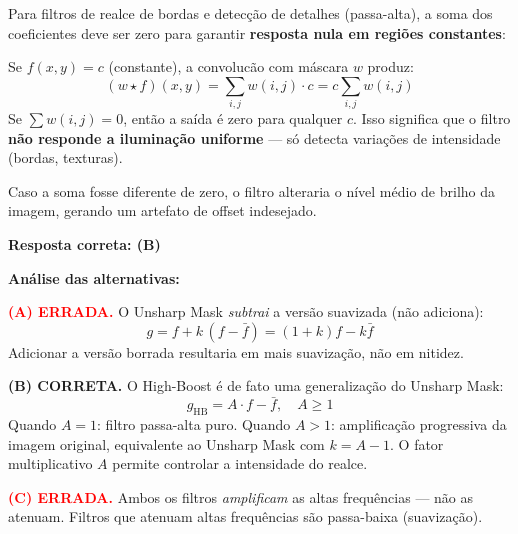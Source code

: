 \documentclass[12pt,a4paper,oneside,brazil]{abntex2}
\begin{document}
\begin{questao}[title=Quest\~ao 4 -- Soma dos coeficientes da m\'ascara = 0]
\end{questao}

\begin{resposta}
Para filtros de realce de bordas e detec\c{c}\~ao de detalhes
(passa-alta), a soma dos coeficientes deve ser zero para garantir
\textbf{resposta nula em regi\~oes constantes}:

Se $f(x,y) = c$ (constante), a convoluc\~ao com m\'ascara $w$ produz:
\[
  (w \star f)(x,y) = \sum_{i,j} w(i,j)\cdot c = c\sum_{i,j}w(i,j)
\]
Se $\sum w(i,j) = 0$, ent\~ao a sa\'ida \'e zero para qualquer $c$.
Isso significa que o filtro \textbf{n\~ao responde a ilumina\c{c}\~ao
uniforme} --- s\'o detecta varia\c{c}\~oes de intensidade (bordas,
texturas).

Caso a soma fosse diferente de zero, o filtro alteraria o n\'ivel
m\'edio de brilho da imagem, gerando um artefato de offset indesejado.
\end{resposta}

\begin{questao}[title=Quest\~ao 5 -- Unsharp Mask e High-Boost (m\'ultipla escolha)]
\end{questao}

\begin{resposta}
\textbf{Resposta correta: (B)}

\medskip
\noindent\textbf{Análise das alternativas:}

\medskip
\noindent\textcolor{red}{\textbf{(A) ERRADA.}} O Unsharp Mask
\emph{subtrai} a vers\~ao suavizada (n\~ao adiciona):
\[
  g = f + k\,(f - \bar{f}) = (1+k)f - k\bar{f}
\]
Adicionar a vers\~ao borrada resultaria em mais suaviza\c{c}\~ao,
n\~ao em nitidez.

\medskip
\noindent\textcolor{green!60!black}{\textbf{(B) CORRETA.}} O High-Boost
\'e de fato uma generaliza\c{c}\~ao do Unsharp Mask:
\[
  g_{\text{HB}} = A \cdot f - \bar{f}, \quad A \geq 1
\]
Quando $A = 1$: filtro passa-alta puro.
Quando $A > 1$: amplifica\c{c}\~ao progressiva da imagem original,
equivalente ao Unsharp Mask com $k = A - 1$.
O fator multiplicativo $A$ permite controlar a intensidade do realce.

\medskip
\noindent\textcolor{red}{\textbf{(C) ERRADA.}} Ambos os filtros
\emph{amplificam} as altas frequ\^encias --- n\~ao as atenuam.
Filtros que atenuam altas frequ\^encias s\~ao passa-baixa (suaviza\c{c}\~ao).
\end{resposta}
\end{document}
